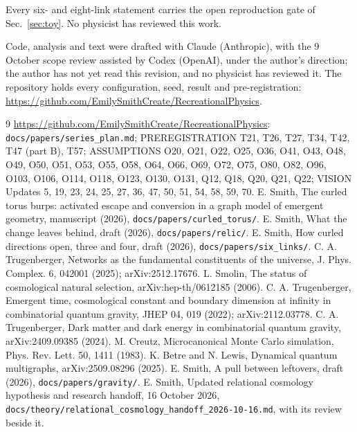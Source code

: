 \documentclass[aps,pre,10pt,twocolumn,superscriptaddress,nofootinbib]{revtex4-2}
\begin{document}
Every six- and eight-link statement carries the open reproduction gate of Sec.~\ref{sec:toy}. No physicist has
reviewed this work.

\begin{acknowledgments}
Code, analysis and text were drafted with Claude (Anthropic), with the 9 October scope review assisted by Codex
(OpenAI), under the author's direction; the author has not yet read this revision, and no physicist has reviewed
it. The
repository holds every configuration, seed, result and pre-registration:
\url{https://github.com/EmilySmithCreate/RecreationalPhysics}.
\end{acknowledgments}

\begin{thebibliography}{9}
 \url{https://github.com/EmilySmithCreate/RecreationalPhysics}: \texttt{docs/papers/series\_plan.md};
PREREGISTRATION T21, T26, T27, T34, T42, T47 (part B), T57; ASSUMPTIONS O20, O21, O22, O25, O36, O41, O43, O48, O49,
O50, O51, O53, O55, O58, O64, O66, O69, O72, O75, O80, O82, O96, O103, O106, O114, O118, O123, O130, O131, Q12, Q18, Q20, Q21, Q22; VISION
Updates 5, 19, 23, 24, 25, 27, 36, 47, 50, 51, 54, 58, 59, 70.
 E. Smith, The curled torus burps: activated escape and conversion in a graph model of emergent
geometry, manuscript (2026), \texttt{docs/papers/curled\_torus/}.
 E. Smith, What the change leaves behind, draft (2026), \texttt{docs/papers/relic/}.
 E. Smith, How curled directions open, three and four, draft (2026),
\texttt{docs/papers/six\_links/}.
 C. A. Trugenberger, Networks as the fundamental constituents of the universe, J. Phys. Complex. 6,
042001 (2025); arXiv:2512.17676.
 L. Smolin, The status of cosmological natural selection, arXiv:hep-th/0612185 (2006).
 C. A. Trugenberger, Emergent time, cosmological constant and boundary dimension at infinity in
combinatorial quantum gravity, JHEP 04, 019 (2022); arXiv:2112.03778.
 C. A. Trugenberger, Dark matter and dark energy in combinatorial quantum gravity, arXiv:2409.09385
(2024).
 M. Creutz, Microcanonical Monte Carlo simulation, Phys. Rev. Lett. 50, 1411 (1983).
 K. Betre and N. Lewis, Dynamical quantum multigraphs, arXiv:2509.08296 (2025).
 E. Smith, A pull between leftovers, draft (2026), \texttt{docs/papers/gravity/}.
 E. Smith, Updated relational cosmology hypothesis and research handoff, 16 October 2026,
\texttt{docs/theory/relational\_cosmology\_handoff\_2026-10-16.md}, with its review beside it.
\end{thebibliography}
\end{document}
